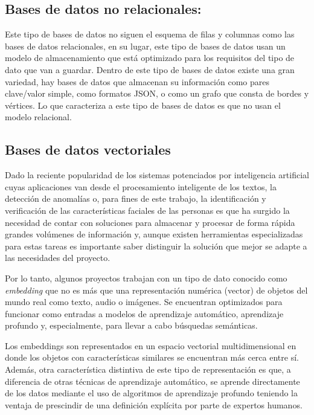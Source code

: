 \subsection{Bases de datos no relacionales:}
Este tipo de bases de datos no siguen el esquema de filas y columnas como las bases de datos relacionales, en su lugar, este tipo de bases de datos usan un modelo de almacenamiento que está optimizado para los requisitos del tipo de dato que van a guardar. Dentro de este tipo de bases de datos existe una gran variedad, hay bases de datos que almacenan su información como pares clave/valor simple, como formatos JSON, o como un grafo que consta de bordes y vértices. Lo que caracteriza a este tipo de bases de datos es que no usan el modelo relacional. \cite{CitaAJ12}



\subsection{Bases de datos vectoriales}

Dado la reciente popularidad de los sistemas potenciados por inteligencia artificial cuyas aplicaciones van desde el procesamiento inteligente de los textos, la detección de anomalías o, para fines de este trabajo, la identificación y verificación de las características faciales de las personas es que ha surgido la necesidad de contar con soluciones para almacenar y procesar de forma rápida grandes volúmenes de información y, aunque existen herramientas especializadas para estas tareas es importante saber distinguir la solución que mejor se adapte a las necesidades del proyecto.

Por lo tanto, algunos proyectos trabajan con un tipo de dato conocido como \textit{embedding} que no es más que una representación numérica (vector) de objetos del mundo real como texto, audio o imágenes. Se encuentran optimizados para funcionar como entradas a modelos de aprendizaje automático, aprendizaje profundo y, especialmente, para llevar a cabo búsquedas semánticas.

Los embeddings son representados en un espacio vectorial multidimensional en donde los objetos con características similares se encuentran más cerca entre sí. Además, otra característica distintiva de este tipo de representación es que, a diferencia de otras técnicas de aprendizaje automático, se aprende directamente de los datos mediante el uso de algoritmos de aprendizaje profundo teniendo la ventaja de prescindir de una definición explícita por parte de expertos humanos.


